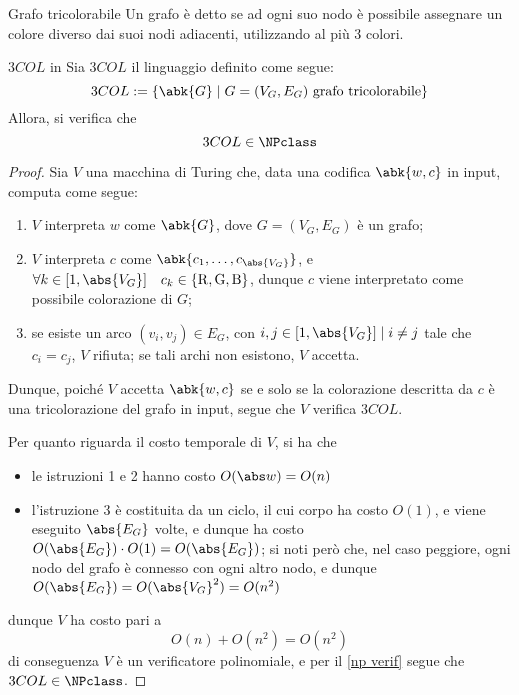 \documentclass[a4paper, 12pt]{report}
\begin{document}
    \begin{frameddefn}{Grafo tricolorabile}
        Un grafo è detto  se ad ogni suo nodo è possibile assegnare un colore diverso dai suoi nodi adiacenti, utilizzando al più 3 colori.
    \end{frameddefn}

    \begin{framedthm}[label={3col in np}]{$3COL$ in \NPclass}
        Sia $3COL$ il linguaggio definito come segue: $$3COL := \{\abk{G} \mid G = (V_G, E_G) \ \textrm{grafo tricolorabile}\}$$ Allora, si verifica che $$3COL \in \NPclass$$
    \end{framedthm}

    \begin{proof}
        Sia $V$ una macchina di Turing che, data una codifica $\abk{w, c}$ in input, computa come segue:

        \begin{enumerate}
            \item $V$ interpreta $w$ come $\abk{G}$, dove $G = (V_G, E_G)$ è un grafo;
            \item $V$ interpreta $c$ come $\abk{c_1, \ldots, c_{\abs{V_G}}}$, e $\forall k \in [1, \abs{V_G}] \quad c_k \in \{\mathrm R, \mathrm G, \mathrm B\}$, dunque $c$ viene interpretato come possibile colorazione di $G$;
            \item se esiste un arco $(v_i, v_j) \in E_G$, con $i, j \in [1, \abs{V_G}] \mid i \neq j$ tale che $c_i = c_j$, $V$ rifiuta; se tali archi non esistono, $V$ accetta.
        \end{enumerate}

        Dunque, poiché $V$ accetta $\abk{w, c}$ se e solo se la colorazione descritta da $c$ è una tricolorazione del grafo in input, segue che $V$ verifica $3COL$.

        Per quanto riguarda il costo temporale di $V$, si ha che

        \begin{itemize}
            \item le istruzioni 1 e 2 hanno costo $O(\abs w) = O(n)$
            \item l'istruzione 3 è costituita da un ciclo, il cui corpo ha costo $O(1)$, e viene eseguito $\abs{E_G}$ volte, e dunque ha costo $O(\abs{E_G}) \cdot O(1) = O(\abs{E_G})$; si noti però che, nel caso peggiore, ogni nodo del grafo è connesso con ogni altro nodo, e dunque $O(\abs{E_G}) = O(\abs{V_G}^2) = O(n^2)$
        \end{itemize}

        dunque $V$ ha costo pari a $$O(n) + O(n^2) = O(n^2)$$ di conseguenza $V$ è un verificatore polinomiale, e per il \cref{np verif} segue che $3COL \in \NPclass$.
    \end{proof}
\end{document}
